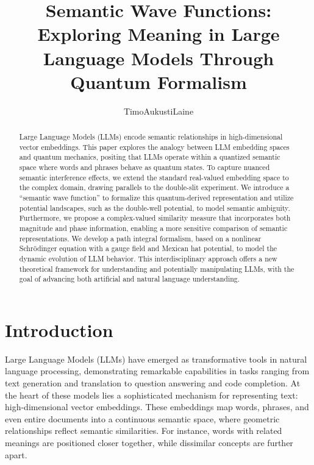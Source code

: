 \documentclass[prd,amsmath,amssymb,12pt]{revtex4}
\begin{document}
\title{Semantic Wave Functions: Exploring Meaning in Large Language Models Through Quantum Formalism}

\author{Timo\hspace*{1mm}Aukusti\hspace*{1mm}Laine \vspace*{0.5cm}}

\begin{abstract}
\baselineskip=14pt
    Large Language Models (LLMs) encode semantic relationships in high-dimensional vector embeddings.
    This paper explores the analogy between LLM embedding spaces and quantum mechanics, positing that LLMs
    operate within a quantized semantic space where words and phrases behave as quantum states. To capture
    nuanced semantic
    interference effects, we extend the standard real-valued embedding space to the complex domain, drawing
    parallels to the double-slit experiment. We introduce a ``semantic wave function'' to formalize this
    quantum-derived representation and utilize potential landscapes, such as the double-well potential,
    to model semantic ambiguity. Furthermore, we propose a complex-valued similarity measure that incorporates
    both magnitude and phase information, enabling a more sensitive comparison of semantic representations.
    We develop a path integral formalism, based on a nonlinear Schrödinger equation with a gauge
    field and Mexican hat potential, to model the dynamic evolution of LLM behavior. This interdisciplinary
    approach offers a new theoretical framework for understanding and potentially manipulating LLMs, with
    the goal of advancing both artificial and natural language understanding.
\end{abstract}

\maketitle

\section{Introduction}

Large Language Models (LLMs) have emerged as transformative tools in natural language processing,
demonstrating remarkable capabilities in tasks ranging from text generation and translation to question
answering and code completion. At the heart of these models lies a sophisticated mechanism for
representing text: high-dimensional vector embeddings. These embeddings map words, phrases, and even entire
documents into a continuous semantic space, where geometric relationships reflect semantic similarities.
For instance, words with related meanings are positioned closer together, while dissimilar concepts are further apart.
\end{document}
